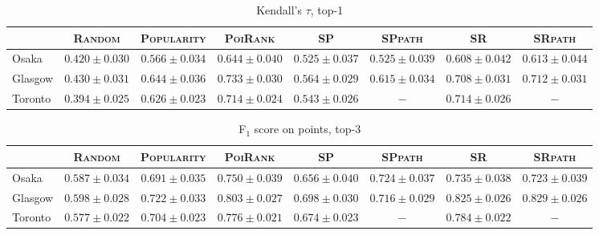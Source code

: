 \begin{table*}[t]
\caption{Kendall's $\tau$, top-1}
\centering
\small
\setlength{\tabcolsep}{4pt} %
\begin{tabular}{l|cc|cc|ccc} \hline
 & \textsc{Random} & \textsc{Popularity} & \textsc{PoiRank} & \textsc{SP} & \textsc{SPpath} & \textsc{SR} & \textsc{SRpath} \\ \hline
Osaka & $0.420\pm0.030$ & $0.566\pm0.034$ & $\mathbf{0.644\pm0.040}$ & $0.525\pm0.037$ & $0.525\pm0.039$ & $0.608\pm0.042$ & $\mathit{0.613\pm0.044}$ \\
Glasgow & $0.430\pm0.031$ & $0.644\pm0.036$ & $\mathbf{0.733\pm0.030}$ & $0.564\pm0.029$ & $0.615\pm0.034$ & $0.708\pm0.031$ & $\mathit{0.712\pm0.031}$ \\
Toronto & $0.394\pm0.025$ & $0.626\pm0.023$ & $\mathbf{0.714\pm0.024}$ & $0.543\pm0.026$ & $-$ & $\mathit{0.714\pm0.026}$ & $-$ \\
\hline
\end{tabular}
\end{table*}

\begin{table*}[t]
\caption{F$_1$ score on points, top-3}
\centering
\small
\setlength{\tabcolsep}{4pt} %
\begin{tabular}{l|cc|cc|ccc} \hline
 & \textsc{Random} & \textsc{Popularity} & \textsc{PoiRank} & \textsc{SP} & \textsc{SPpath} & \textsc{SR} & \textsc{SRpath} \\ \hline
Osaka & $0.587\pm0.034$ & $0.691\pm0.035$ & $\mathbf{0.750\pm0.039}$ & $0.656\pm0.040$ & $0.724\pm0.037$ & $\mathit{0.735\pm0.038}$ & $0.723\pm0.039$ \\
Glasgow & $0.598\pm0.028$ & $0.722\pm0.033$ & $0.803\pm0.027$ & $0.698\pm0.030$ & $0.716\pm0.029$ & $\mathit{0.825\pm0.026}$ & $\mathbf{0.829\pm0.026}$ \\
Toronto & $0.577\pm0.022$ & $0.704\pm0.023$ & $\mathit{0.776\pm0.021}$ & $0.674\pm0.023$ & $-$ & $\mathbf{0.784\pm0.022}$ & $-$ \\
\hline
\end{tabular}
\end{table*}

